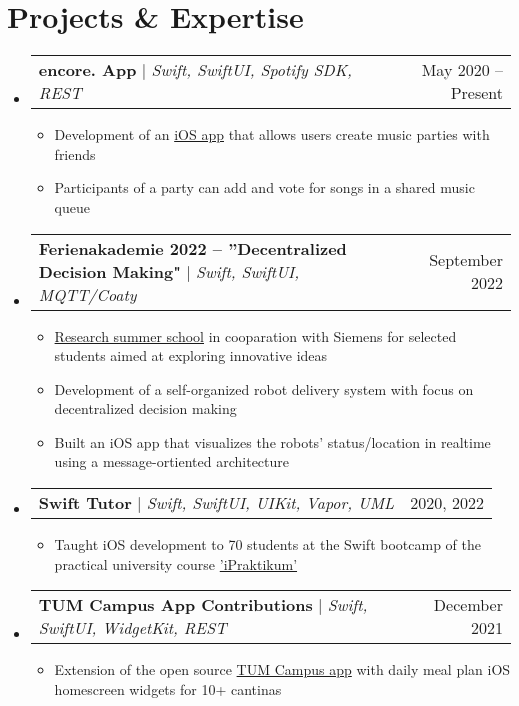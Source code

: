 \documentclass[letterpaper,11pt]{article}
\makeatletter
\newcommand{\resumeItem}[1]{
  \item\small{
    {#1 \vspace{-2pt}}
  }
}
\newcommand{\resumeProjectHeading}[2]{
    \item
    \begin{tabular*}{0.97\textwidth}{l@{\extracolsep{\fill}}r}
      \small#1 & #2 \\
    \end{tabular*}\vspace{-7pt}
}
\newcommand{\resumeSubHeadingListStart}{\begin{itemize}[leftmargin=0.15in, label={}]}
\newcommand{\resumeSubHeadingListEnd}{\end{itemize}}
\newcommand{\resumeItemListStart}{\begin{itemize}}
\newcommand{\resumeItemListEnd}{\end{itemize}\vspace{-5pt}}
\makeatother
\begin{document}
\section{Projects \& Expertise}
    \resumeSubHeadingListStart
    \resumeProjectHeading
          {\textbf{encore. App} $|$ \emph{Swift, SwiftUI, Spotify SDK, REST}}{May 2020 -- Present}
          \resumeItemListStart
            \resumeItem{Development of an \href{https://github.com/NikolaiMadlener/EncoreApp}{iOS app} that allows users create music parties with friends}
            \resumeItem{Participants of a party can add and vote for songs in a shared music queue}
          \resumeItemListEnd

    \resumeProjectHeading
      {\textbf{Ferienakademie 2022 -- ”Decentralized Decision Making"}  $|$ \emph{Swift, SwiftUI, MQTT/Coaty}}{September 2022}
      \resumeItemListStart
        \resumeItem{\href{https://ase.in.tum.de/lehrstuhl_1/projects/1193-ferienakademie-2022}{Research summer school} in cooparation with Siemens for selected students aimed at exploring innovative ideas}
        \resumeItem{Development of a self-organized robot delivery system with focus on decentralized decision making}
        \resumeItem{Built an iOS app that visualizes the robots' status/location in realtime using a message-ortiented architecture}
      \resumeItemListEnd

      \resumeProjectHeading
          {\textbf{Swift Tutor} $|$ \emph{Swift, SwiftUI, UIKit, Vapor, UML}}{2020, 2022}
          \resumeItemListStart
            \resumeItem{Taught iOS development to 70 students at the Swift bootcamp of the practical university course \href{https://ase.in.tum.de/lehrstuhl_1/teaching/159-teaching/wt2223/1201-ipraktikum-ws2223}{'iPraktikum'}}
          \resumeItemListEnd

      \resumeProjectHeading
          {\textbf{TUM Campus App Contributions} $|$ \emph{Swift, SwiftUI, WidgetKit, REST}}{December 2021}
          \resumeItemListStart
            \resumeItem{Extension of the open source \href{https://github.com/TUM-Dev/Campus-iOS}{TUM Campus app} with daily meal plan iOS homescreen widgets for 10+ cantinas}
          \resumeItemListEnd

    \resumeSubHeadingListEnd

\end{document}
